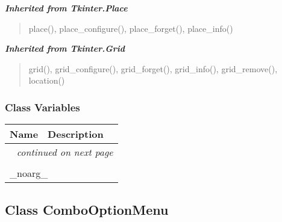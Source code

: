 \large{\textbf{\textit{Inherited from Tkinter.Place}}}

\begin{quote}
place(), place\_configure(), place\_forget(), place\_info()
\end{quote}

\large{\textbf{\textit{Inherited from Tkinter.Grid}}}

\begin{quote}
grid(), grid\_configure(), grid\_forget(), grid\_info(), grid\_remove(), location()
\end{quote}


  \subsubsection{Class Variables}

    \vspace{-1cm}
\hspace{\varindent}\begin{longtable}{|p{\varnamewidth}|p{\vardescrwidth}|l}
\cline{1-2}
\cline{1-2} \centering \textbf{Name} & \centering \textbf{Description}& \\
\cline{1-2}
\endhead\cline{1-2}\multicolumn{3}{r}{\small\textit{continued on next page}}\\\endfoot\cline{1-2}
\endlastfoot\multicolumn{2}{|l|}{\textit{Inherited from Tkinter.Misc}}\\
\multicolumn{2}{|p{\varwidth}|}{\raggedright \_noarg\_}\\
\cline{1-2}
\end{longtable}



\subsection{Class ComboOptionMenu}

